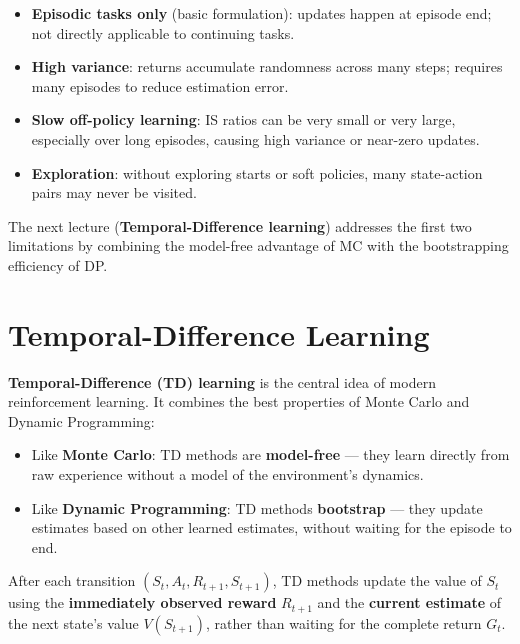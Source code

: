 \documentclass[11pt,a4paper]{article}
\theoremstyle{definition}
\theoremstyle{plain}
\theoremstyle{remark}
\begin{document}
\begin{tcolorbox}[colback=yellow!10!white, colframe=orange!80!black, title={Limitations of Monte Carlo Methods}]
\begin{itemize}
    \item \textbf{Episodic tasks only} (basic formulation): updates happen at episode end; not directly applicable to continuing tasks.
    \item \textbf{High variance}: returns accumulate randomness across many steps; requires many episodes to reduce estimation error.
    \item \textbf{Slow off-policy learning}: IS ratios can be very small or very large, especially over long episodes, causing high variance or near-zero updates.
    \item \textbf{Exploration}: without exploring starts or soft policies, many state-action pairs may never be visited.
\end{itemize}
The next lecture (\textbf{Temporal-Difference learning}) addresses the first two limitations by combining the model-free advantage of MC with the bootstrapping efficiency of DP.
\end{tcolorbox}


\part{Temporal-Difference Learning}

\textbf{Temporal-Difference (TD) learning} is the central idea of modern reinforcement learning. It combines the best properties of Monte Carlo and Dynamic Programming:

\begin{itemize}
    \item Like \textbf{Monte Carlo}: TD methods are \textbf{model-free} — they learn directly from raw experience without a model of the environment's dynamics.
    \item Like \textbf{Dynamic Programming}: TD methods \textbf{bootstrap} — they update estimates based on other learned estimates, without waiting for the episode to end.
\end{itemize}

\begin{tcolorbox}[colback=blue!5!white, colframe=blue!60!black, title={The Central Idea of TD Learning}]
After each transition $(S_t, A_t, R_{t+1}, S_{t+1})$, TD methods update the value of $S_t$ using the \textbf{immediately observed reward} $R_{t+1}$ and the \textbf{current estimate} of the next state's value $V(S_{t+1})$, rather than waiting for the complete return $G_t$.
\end{tcolorbox}
\end{document}
